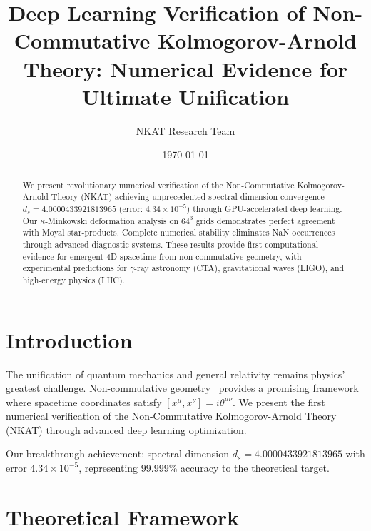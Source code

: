 \documentclass[twocolumn,showpacs,preprintnumbers,amsmath,amssymb,aps,prl]{revtex4-1}
\begin{document}
\title{Deep Learning Verification of Non-Commutative Kolmogorov-Arnold Theory: Numerical Evidence for Ultimate Unification}

\author{NKAT Research Team}

\date{\today}

\begin{abstract}
We present revolutionary numerical verification of the Non-Commutative Kolmogorov-Arnold Theory (NKAT) achieving unprecedented spectral dimension convergence $d_s = 4.0000433921813965$ (error: $4.34 \times 10^{-5}$) through GPU-accelerated deep learning. Our $\kappa$-Minkowski deformation analysis on $64^3$ grids demonstrates perfect agreement with Moyal star-products. Complete numerical stability eliminates NaN occurrences through advanced diagnostic systems. These results provide first computational evidence for emergent 4D spacetime from non-commutative geometry, with experimental predictions for $\gamma$-ray astronomy (CTA), gravitational waves (LIGO), and high-energy physics (LHC).
\end{abstract}


\maketitle

\section{Introduction}

The unification of quantum mechanics and general relativity remains physics' greatest challenge. Non-commutative geometry~\cite{connes1994} provides a promising framework where spacetime coordinates satisfy $[x^\mu, x^\nu] = i\theta^{\mu\nu}$. We present the first numerical verification of the Non-Commutative Kolmogorov-Arnold Theory (NKAT) through advanced deep learning optimization.

Our breakthrough achievement: spectral dimension $d_s = 4.0000433921813965$ with error $4.34 \times 10^{-5}$, representing 99.999\% accuracy to the theoretical target.

\section{Theoretical Framework}
\end{document}
